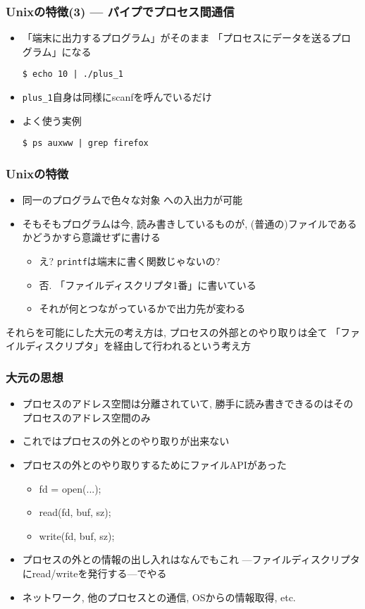\documentclass[12pt,dvipdfmx]{beamer}
\begin{document}
\begin{frame}[fragile]
  \frametitle{Unixの特徴(3) --- パイプでプロセス間通信}
  \begin{itemize}
  \item 「端末に出力するプログラム」がそのまま
    「プロセスにデータを送るプログラム」になる
\begin{lstlisting}
$ echo 10 | ./plus_1 
\end{lstlisting} %
\item {\tt plus\_1}自身は同様にscanfを呼んでいるだけ
  \item よく使う実例
\begin{lstlisting}
$ ps auxww | grep firefox
\end{lstlisting} %
\end{itemize}
\end{frame}

\begin{frame}
  \frametitle{Unixの特徴}
  \begin{itemize}
  \item 同一のプログラムで色々な対象
    への入出力が可能
  \item そもそもプログラムは今, 読み書きしているものが,
    (普通の)ファイルであるかどうかすら意識せずに書ける
    \begin{itemize}
    \item え? {\tt printf}は端末に書く関数じゃないの?
    \item 否. 「ファイルディスクリプタ1番」に書いている
    \item それが何とつながっているかで出力先が変わる
    \end{itemize}
  \end{itemize}
  それらを可能にした大元の考え方は,
  プロセスの外部とのやり取りは全て
  「ファイルディスクリプタ」を経由して行われるという考え方
\end{frame}


\begin{frame}
  \frametitle{大元の思想}
  \begin{itemize}
  \item<1-> プロセスのアドレス空間は分離されていて,
    勝手に読み書きできるのはそのプロセスのアドレス空間のみ
  \item<2-> これではプロセスの外とのやり取りが出来ない
  \item<3-> プロセスの外とのやり取りするためにファイルAPIがあった
    \begin{itemize}
    \item fd = open(...);
    \item read(fd, buf, sz);
    \item write(fd, buf, sz);
    \end{itemize}
  \item<4-> プロセスの外との情報の出し入れはなんでもこれ
    ---ファイルディスクリプタにread/writeを発行する---でやる
  \item<5-> ネットワーク, 他のプロセスとの通信, OSからの情報取得, etc.
  \end{itemize}
\end{frame}
\end{document}
